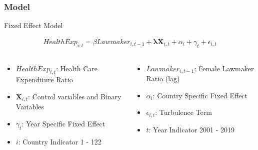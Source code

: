 \documentclass[12pt]{beamer}
\begin{document}
\begin{frame}
	\frametitle{Model}
	\begin{center}
		\alert{Fixed Effect Model}
	\end{center}
\vspace*{-1\baselineskip}
\begin{align*}
	HealthExp_{i,t} = \beta Lawmaker_{i,t-1} + \boldsymbol{\lambda}\mathbf{X}_{i,t} + \alpha_i + \gamma_t + \epsilon_{i,t}
\end{align*}
\vspace*{-1.2\baselineskip}
\begin{columns}
	\begin{column}{0.5\textwidth}
\begin{itemize}
\item $HealthExp_{i, t}$: Health Care Expenditure Ratio
\item $\mathbf{X}_{i,t}$: Control variables and Binary Variables
\item $\gamma_{t}$: Year Specific Fixed Effect
\item $i$: Country Indicator 1 - 122

\end{itemize}
	\end{column}
	\begin{column}{0.5\textwidth}  
		\begin{center}
\begin{itemize}
\item $Lawmaker_{i, t-1}$: Female Lawmaker Ratio (lag)
\item$\alpha_i$: Country Specific Fixed Effect
\item $\epsilon_{i,t}$: Turbulence Term
\item $t$: Year Indicator 2001 - 2019

\end{itemize}
		\end{center}
	\end{column}
\end{columns}
	
\end{frame}
\end{document}
